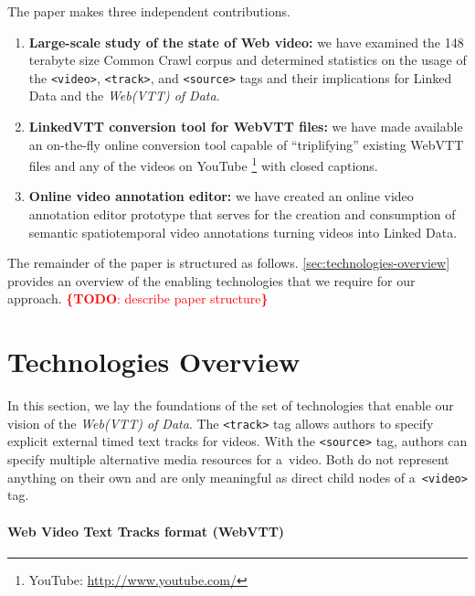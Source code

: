 \documentclass{sig-alternate}
\newcommand{\inlinelistingsize}{\fontsize{8pt}{11pt}}
\let\oldurl\url
\renewcommand{\url}[1]{\inlinelistingsize\oldurl{#1}}
\newcommand{\todo}[1]{\noindent\textcolor{red}{{\bf \{TODO}: #1{\bf \}}}}
\begin{document}
The paper makes three independent contributions.

\begin{enumerate}[label=\textit{\roman*)},leftmargin=*]
  \item \textbf{Large-scale study of the state of Web video:}
    we have examined the 148 terabyte size Common Crawl corpus
    and determined statistics on the usage of the \texttt{<video>},
    \texttt{<track>}, and \texttt{<source>} tags
    and their implications for Linked Data and the \emph{Web(VTT) of Data}.
  \item \textbf{LinkedVTT conversion tool for WebVTT files:}
  we have made available an on-the-fly online conversion tool
  capable of ``triplifying'' existing WebVTT files
  and any of the videos on YouTube%
  \footnote{YouTube: \url{http://www.youtube.com/}} with closed captions.
  \item \textbf{Online video annotation editor:} we have created an
  online video annotation editor prototype that serves for the creation
  and consumption of semantic spatiotemporal video annotations
  turning videos into Linked Data.
\end{enumerate}

The remainder of the paper is structured as follows.
\autoref{sec:technologies-overview} provides an overview
of the enabling technologies that we require for our approach.
\todo{describe paper structure}

\section{Technologies Overview}
\label{sec:technologies-overview}

In this section, we lay the foundations of the set of technologies
that enable our vision of the \emph{Web(VTT) of Data}.
The \texttt{<track>} tag allows authors to specify explicit
external timed text tracks for videos.
With the \texttt{<source>} tag, authors can specify
multiple alternative media resources for a~video.
Both do not represent anything on their own
and are only meaningful as direct child nodes of a~\texttt{<video>} tag.

\paragraph{Web Video Text Tracks format (WebVTT)}
\end{document}
